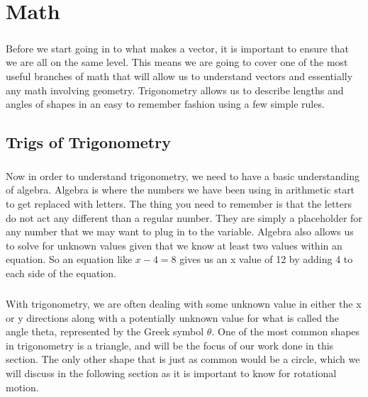 \documentclass[12pt, letterpaper]{report}
\begin{document}
\chapter{Math}
\paragraph{} Before we start going in to what makes a vector, it is important to ensure that we are all on the same level. This means we are going to cover one of the most useful branches of math that will allow us to understand vectors and essentially any math involving geometry. Trigonometry allows us to describe lengths and angles of shapes in an easy to remember fashion using a few simple rules. 
	\section{Trigs of Trigonometry}
	\paragraph{} Now in order to understand trigonometry, we need to have a basic understanding of algebra. Algebra is where the numbers we have been using in arithmetic start to get replaced with letters. The thing you need to remember is that the letters do not act any different than a regular number. They are simply a placeholder for any number that we may want to plug in to the variable. Algebra also allows us to solve for unknown values given that we know at least two values within an equation. So an equation like $x - 4 = 8$ gives us an x value of 12 by adding 4 to each side of the equation.
	\paragraph{} With trigonometry, we are often dealing with some unknown value in either the x or y directions along with a potentially unknown value for what is called the angle theta, represented by the Greek symbol $\theta$. One of the most common shapes in trigonometry is a triangle, and will be the focus of our work done in this section. The only other shape that is just as common would be a circle, which we will discuss in the following section as it is important to know for rotational motion.
\end{document}
